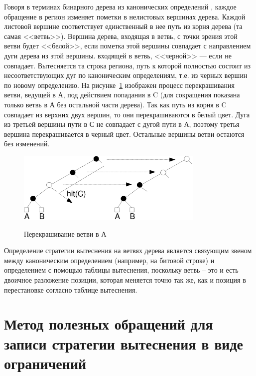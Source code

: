 Говоря в терминах бинарного дерева из канонических определений \PseudoLRU, каждое обращение в регион изменяет пометки в нелистовых вершинах дерева. Каждой листовой вершине соответствует единственный в нее путь из корня дерева (та самая <<ветвь>>). Вершина дерева, входящая в ветвь, с точки зрения этой ветви будет <<белой>>, если пометка этой вершины совпадает с направлением дуги дерева из этой вершины. входящей в ветвь, <<черной>> --- если не совпадает. Вытесняется та строка региона, путь к которой полностью состоит из несоответствующих дуг по каноническим определениям, т.е. из черных вершин по новому определению. На рисунке~\ref{recolor}
изображен процесс перекрашивания ветви, ведущей в А, под действием
попадания в C (для сокращения показана только ветвь в А без
остальной части дерева). Так как путь из корня в C совпадает из
верхних двух вершин, то они перекрашиваются в белый цвет. Дуга из
третьей вершины пути в С не совпадает с дугой пути в А, поэтому
третья вершина перекрашивается в черный цвет. Остальные вершины
ветви остаются без изменений.

\begin{figure}[h] \center
  \includegraphics[width=0.8\textwidth]{1.review/recolor}\\
  \caption{Перекрашивание ветви в А}\label{recolor}
\end{figure}


Определение стратегии вытеснения \PseudoLRU на ветвях дерева
является связующим звеном между каноническим определением (например,
на битовой строке) и определением с помощью таблицы вытеснения,
поскольку ветвь -- это и есть двоичное разложение позиции, которая меняется точно так же, как и позиция в перестановке согласно таблице вытеснения.



\section{Метод полезных обращений для записи стратегии вытеснения в виде ограничений}\label{sec:usefulness_functions}

